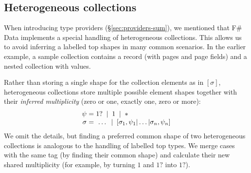 \documentclass[10pt,preprint,blind,clearpagebib]{sigplanconf}
\newcommand{\strf}[1]{\textnormal{\textcolor{strclr}{\sffamily #1}}}
\newcommand{\lsep}[0]{\;\; | \;\;}
\newcommand{\narrow}[1]{\hspace{-0.7em} #1 \hspace{-0.7em}}
\begin{document}

\subsection{Heterogeneous collections} 
\label{sec:impl-hetero}

When introducing type providers (\S\ref{sec:providers-sum}), we mentioned that F\# Data 
implements a special handling of heterogeneous collections. This allows us to avoid inferring a 
labelled top shapes in many common scenarios. In the earlier example, a sample collection 
contains a record (with \strf{pages} and \strf{page} fields) and a nested collection with values.

Rather than storing a single shape for the collection elements as in $[\sigma]$, heterogeneous
collections store multiple possible element shapes together with their \emph{  inferred multiplicity} 
(zero or one, exactly one, zero or more):
%
\begin{equation*}
\begin{array}{rcl}
 \psi &\narrow{=}& 1? \lsep 1 \lsep \ast \\
 \sigma &\narrow{=}& ~\ldots \lsep [\sigma_1, \psi_1 | \ldots | \sigma_n, \psi_n ]
\end{array}
\end{equation*}
%
We omit the details, but finding a preferred common shape of two heterogeneous 
collections is analogous to the handling of labelled top types. We merge cases with the same tag (by finding 
their common shape) and calculate their new shared multiplicity (for example, by turning 
$1$ and $1?$ into $1?$).



%
%
\end{document}
